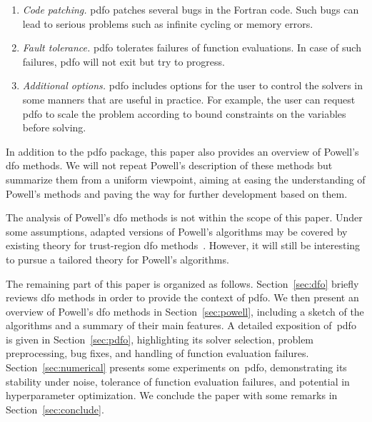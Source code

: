 \documentclass[
    smallextended,  %
    final,          %
]{svjour3}
\begin{document}
\begin{enumerate}
    \item \emph{Code patching.}
        \gls{pdfo} patches several bugs in the Fortran code.
        Such bugs can lead to serious problems such as infinite cycling or memory errors.

    \item \emph{Fault tolerance.}
        \gls{pdfo} tolerates failures of function evaluations. %
    In case of such failures, \gls{pdfo} will not exit but try to progress.

    \item \emph{Additional options.}
    \gls{pdfo} includes options for the user to control the solvers in some manners that are useful in practice.
    For example, the user can request \gls{pdfo} to scale the problem according to bound constraints on the variables before solving.
\end{enumerate}

In addition to the \gls{pdfo} package, this paper also provides an overview of Powell's \gls{dfo}
methods. We will not repeat Powell's description of these methods but summarize them from a uniform
viewpoint, aiming at easing the understanding of Powell's methods and paving the way for further
development based on them.

The analysis of Powell's \gls{dfo} methods is not within the scope of this paper.
Under some assumptions, adapted versions of Powell's algorithms may be covered by existing theory
for trust-region \gls{dfo} methods~\cite[Chapter~10]{Conn_Scheinberg_Vicente_2009b}. However, it
will still be interesting to pursue a tailored theory for Powell's algorithms.

The remaining part of this paper is organized as follows.
Section~\ref{sec:dfo} briefly reviews \gls{dfo} methods in order to provide the context of \gls{pdfo}.
We then present an overview of Powell's \gls{dfo} methods in Section~\ref{sec:powell},
including a sketch of the algorithms and a summary of their main features.
A detailed exposition of~\gls{pdfo} is given in Section~\ref{sec:pdfo},
highlighting its solver selection, problem preprocessing, bug fixes,
and handling of function evaluation failures.
Section~\ref{sec:numerical} presents some experiments on~\gls{pdfo}, demonstrating its
stability under noise, tolerance of function evaluation failures, and potential in
hyperparameter optimization.
We conclude the paper with some remarks in Section~\ref{sec:conclude}.
\end{document}
